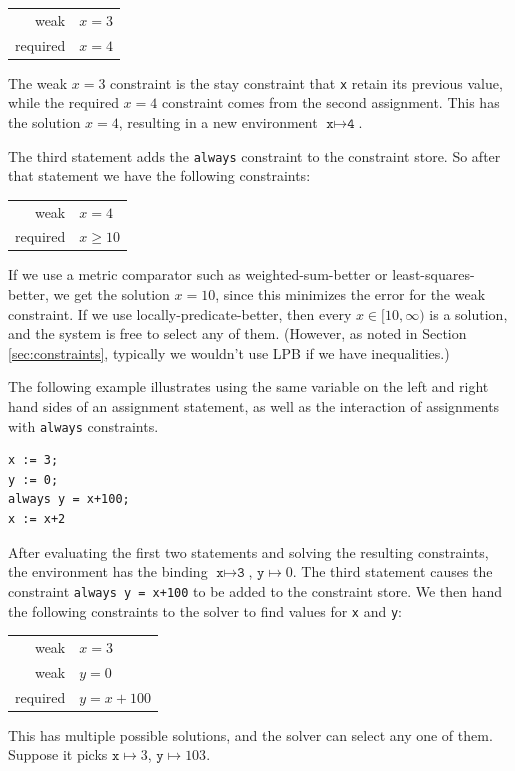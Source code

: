 \documentclass{article}
\begin{document}
\begin{tabular}{rl}
weak     & $x=3$ \\
required & $x=4$
\end{tabular}

The weak $x=3$ constraint is the stay constraint that \texttt{x}
retain its previous value, while the required $x=4$ constraint comes
from the second assignment.  This has the solution $x=4$, resulting in
a new environment $\texttt{x} \mapsto \texttt{4}$.  

The third statement adds the \texttt{always} constraint to the
constraint store.  So after that statement we have the following
constraints:

\begin{tabular}{rl}
weak     & $x=4$ \\
required & $x \geq 10$
\end{tabular}

If we use a metric comparator such as weighted-sum-better or
least-squares-better, we get the solution $x=10$, since this minimizes
the error for the weak constraint.  If we use
locally-predicate-better, then every $x \in [10,\infty)$ is a solution,
and the system is free to select any of them.  (However, as noted in
Section \ref{sec:constraints}, typically we wouldn't use LPB if we
have inequalities.)

The following example illustrates using the same variable on the left
and right hand sides of an assignment statement, as well as the
interaction of assignments with \verb|always| constraints.
\begin{verbatim}
x := 3;
y := 0;
always y = x+100;
x := x+2
\end{verbatim}

After evaluating the first two statements and solving the resulting
constraints, the environment has the binding 
$\texttt{x} \mapsto \texttt{3}$, $\texttt{y} \mapsto 0$.  The third
statement causes the constraint \verb|always y = x+100| to be added to
the constraint store.  We then hand the following constraints to the
solver to find values for \texttt{x} and \texttt{y}:

\begin{tabular}{rl}
weak     & $x=3$ \\
weak     & $y=0$ \\
required & $y=x+100$
\end{tabular}

This has multiple possible solutions, and the solver can select any
one of them.  Suppose it picks $\texttt{x} \mapsto 3$, 
$\texttt{y} \mapsto 103$.
\end{document}
